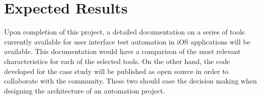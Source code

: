 \section{Expected Results}
Upon completion of this project, a detailed documentation on a series of tools currently available for user interface test automation in iOS applications will be available. This documentation would have a comparison of the most relevant characteristics for each of the selected tools. On the other hand, the code developed for the case study will be published as open source in order to collaborate with the community. These two should ease the decision making when designing the architecture of an automation project.